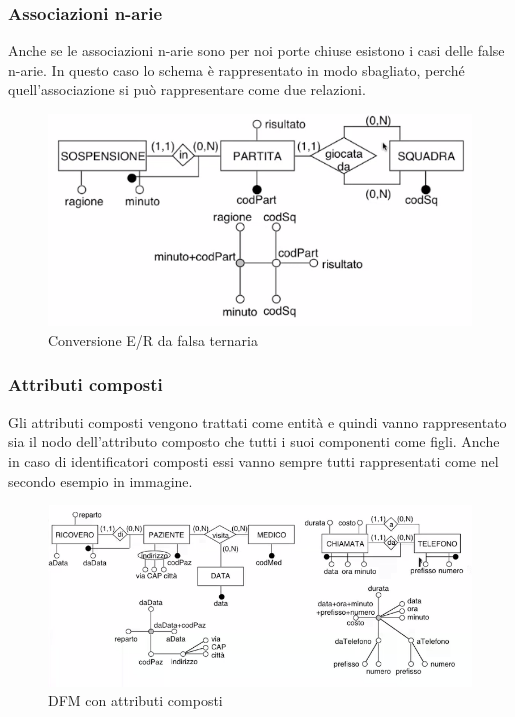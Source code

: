 \subsubsection{Associazioni n-arie}
Anche se le associazioni n-arie sono per noi porte chiuse esistono i casi delle false n-arie. In questo caso lo schema è rappresentato in modo sbagliato, perché quell'associazione si può rappresentare come due relazioni.
\begin{figure}[H]
	\begin{center}
		\includegraphics[width=0.8\linewidth]{img/falsetern.PNG}
		\caption{Conversione E/R da falsa ternaria}
	\end{center}
\end{figure}

\subsubsection{Attributi composti}
Gli attributi composti vengono trattati come entità e quindi vanno rappresentato sia il nodo dell'attributo composto che tutti i suoi componenti come figli. Anche in caso di identificatori composti essi vanno sempre tutti rappresentati come nel secondo esempio in immagine.
\begin{figure}[H]
	\begin{center}
		\includegraphics[width=0.9\linewidth]{img/composti.PNG}		\caption{DFM con attributi composti}
	\end{center}
\end{figure}

